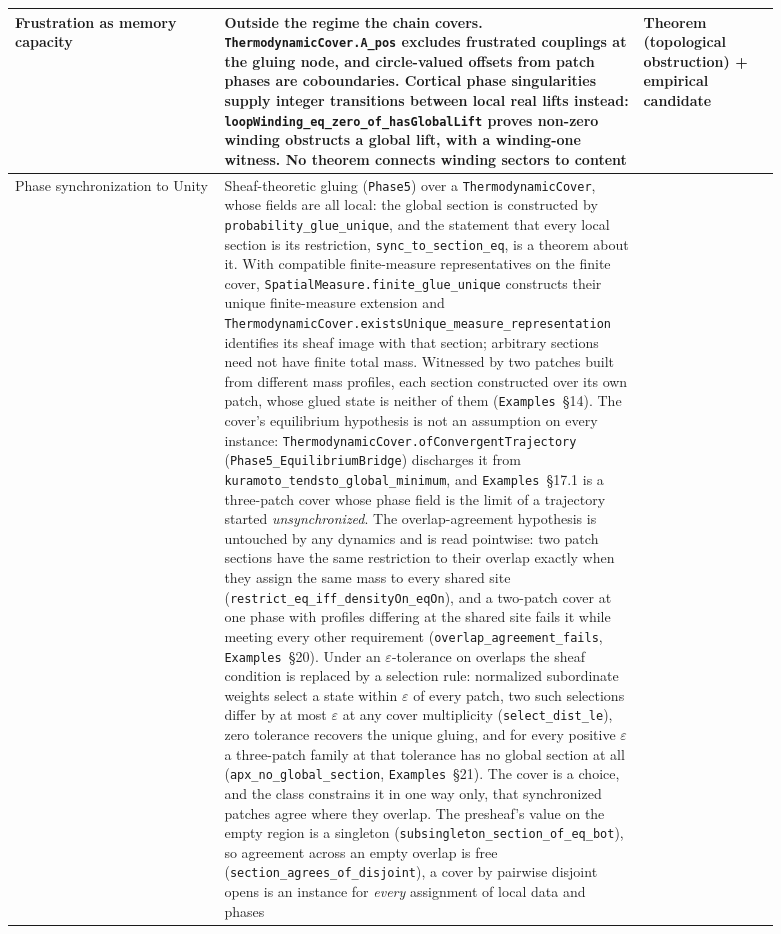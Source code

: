 \documentclass{article}
\begin{document}
\begin{longtable}{|>{\raggedright\arraybackslash}p{0.26\linewidth}|>{\raggedright\arraybackslash}p{0.46\linewidth}|>{\raggedright\arraybackslash}p{0.17\linewidth}|}
Frustration as memory capacity & \textbf{Outside the regime the chain covers.} \nolinkurl{ThermodynamicCover.A_pos} excludes frustrated couplings at the gluing node, and circle-valued offsets from patch phases are coboundaries. Cortical phase singularities supply integer transitions between local real lifts instead: \nolinkurl{loopWinding_eq_zero_of_hasGlobalLift} proves non-zero winding obstructs a global lift, with a winding-one witness. No theorem connects winding sectors to content & Theorem (topological obstruction) + empirical candidate \\ \hline
Phase synchronization to Unity & Sheaf-theoretic gluing (\texttt{Phase5}) over a \texttt{ThermodynamicCover}, whose fields are all local: the global section is constructed by \nolinkurl{probability_glue_unique}, and the statement that every local section is its restriction, \nolinkurl{sync_to_section_eq}, is a theorem about it. With compatible finite-measure representatives on the finite cover, \nolinkurl{SpatialMeasure.finite_glue_unique} constructs their unique finite-measure extension and \nolinkurl{ThermodynamicCover.existsUnique_measure_representation} identifies its sheaf image with that section; arbitrary sections need not have finite total mass. Witnessed by two patches built from different mass profiles, each section constructed over its own patch, whose glued state is neither of them (\texttt{Examples}~\S14). The cover's equilibrium hypothesis is not an assumption on every instance: \nolinkurl{ThermodynamicCover.ofConvergentTrajectory} (\nolinkurl{Phase5_EquilibriumBridge}) discharges it from \nolinkurl{kuramoto_tendsto_global_minimum}, and \texttt{Examples}~\S17.1 is a three-patch cover whose phase field is the limit of a trajectory started \emph{unsynchronized}. The overlap-agreement hypothesis is untouched by any dynamics and is read pointwise: two patch sections have the same restriction to their overlap exactly when they assign the same mass to every shared site (\nolinkurl{restrict_eq_iff_densityOn_eqOn}), and a two-patch cover at one phase with profiles differing at the shared site fails it while meeting every other requirement (\nolinkurl{overlap_agreement_fails}, \texttt{Examples}~\S20). Under an $\varepsilon$-tolerance on overlaps the sheaf condition is replaced by a selection rule: normalized subordinate weights select a state within $\varepsilon$ of every patch, two such selections differ by at most $\varepsilon$ at any cover multiplicity (\nolinkurl{select_dist_le}), zero tolerance recovers the unique gluing, and for every positive $\varepsilon$ a three-patch family at that tolerance has no global section at all (\nolinkurl{apx_no_global_section}, \texttt{Examples}~\S21). The cover is a choice, and the class constrains it in one way only, that synchronized patches agree where they overlap. The presheaf's value on the empty region is a singleton (\nolinkurl{subsingleton_section_of_eq_bot}), so agreement across an empty overlap is free (\nolinkurl{section_agrees_of_disjoint}), a cover by pairwise disjoint opens is an instance for \emph{every} assignment of local data and phases 
\end{longtable}
\end{document}
